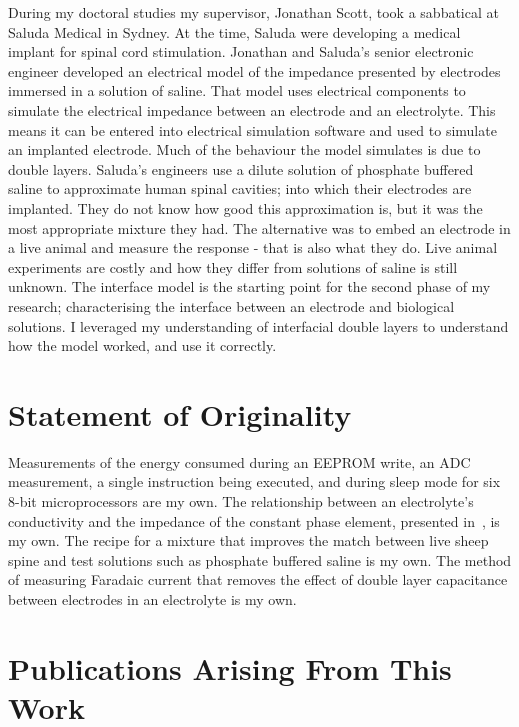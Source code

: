   During my doctoral studies my supervisor, Jonathan Scott, took a sabbatical at Saluda Medical in Sydney.
  At the time, Saluda were developing a medical implant for spinal cord stimulation.
  Jonathan and Saluda's senior electronic engineer developed an electrical model of the impedance presented by electrodes immersed in a solution of saline.
  That model uses electrical components to simulate the electrical impedance between an electrode and an electrolyte.
  This means it can be entered into electrical simulation software and used to simulate an implanted electrode.
  Much of the behaviour the model simulates is due to double layers.
  Saluda's engineers use a dilute solution of phosphate buffered saline to approximate human spinal cavities; into which their electrodes are implanted.
  They do not know how good this approximation is, but it was the most appropriate mixture they had.
  The alternative was to embed an electrode in a live animal and measure the response - that is also what they do.
  Live animal experiments are costly and how they differ from solutions of saline is still unknown.
  The interface model is the starting point for the second phase of my research; characterising the interface between an electrode and biological solutions.
  I leveraged my understanding of interfacial double layers to understand how the model worked, and use it correctly.


\section{Statement of Originality}


  Measurements of the energy consumed during an EEPROM write, an ADC measurement, a single instruction being executed, and during sleep mode for six 8-bit microprocessors are my own.
  The relationship between an electrolyte's conductivity and the impedance of the constant phase element, presented in~, is my own.
  The recipe for a mixture that improves the match between live sheep spine and test solutions such as phosphate buffered saline is my own.
  The method of measuring Faradaic current that removes the effect of double layer capacitance between electrodes in an electrolyte is my own.


\section{Publications Arising From This Work}


